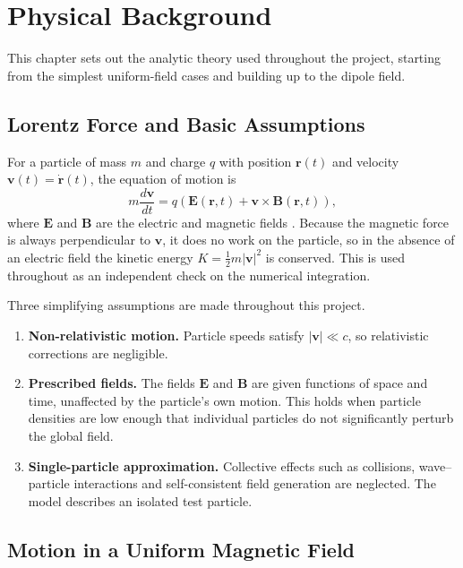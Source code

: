 \chapter{Physical Background}
\label{ch:background}

This chapter sets out the analytic theory used throughout the project,
starting from the simplest uniform-field cases and building up to the
dipole field.

\section{Lorentz Force and Basic Assumptions}
\label{sec:lorentz}

For a particle of mass $m$ and charge $q$ with position $\mathbf{r}(t)$
and velocity $\mathbf{v}(t) = \dot{\mathbf{r}}(t)$, the equation of
motion is
\begin{equation}
  m \frac{d\mathbf{v}}{dt} = q\left(\mathbf{E}(\mathbf{r},t) +
    \mathbf{v} \times \mathbf{B}(\mathbf{r},t)\right),
  \label{eq:lorentz}
\end{equation}
where $\mathbf{E}$ and $\mathbf{B}$ are the electric and magnetic fields
\citep{baumjohann1996}. Because the magnetic force is always perpendicular
to $\mathbf{v}$, it does no work on the particle, so in the absence of
an electric field the kinetic energy
$K = \tfrac{1}{2}m|\mathbf{v}|^2$ is conserved. This is used throughout
as an independent check on the numerical integration.

Three simplifying assumptions are made throughout this project.
\begin{enumerate}
  \item \textbf{Non-relativistic motion.} Particle speeds satisfy
    $|\mathbf{v}| \ll c$, so relativistic corrections are negligible.
  \item \textbf{Prescribed fields.} The fields $\mathbf{E}$ and
    $\mathbf{B}$ are given functions of space and time, unaffected by the
    particle's own motion. This holds when particle densities are low
    enough that individual particles do not significantly perturb the
    global field.
  \item \textbf{Single-particle approximation.} Collective effects
    such as collisions, wave--particle interactions and self-consistent
    field generation are neglected. The model describes an isolated
    test particle.
\end{enumerate}

\section{Motion in a Uniform Magnetic Field}
\label{sec:uniform_B}

